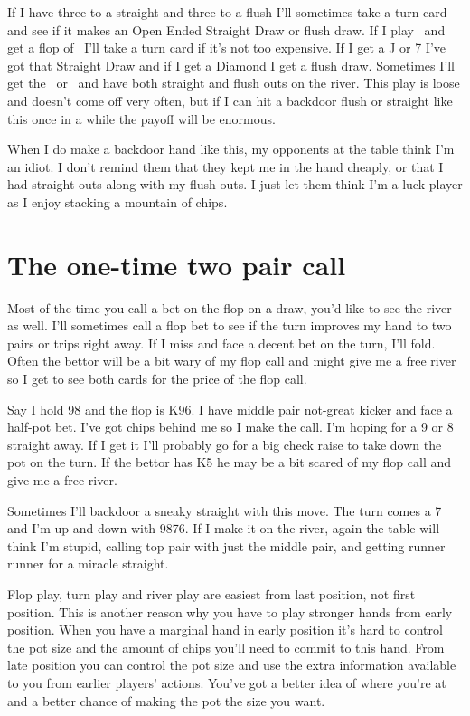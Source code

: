 If I have three to a straight and three to a flush I'll sometimes
take a turn card and see if it makes an Open Ended Straight Draw or
flush draw. If I play \tend\nined\ and get a flop of \Ah\eigd\twoc\ I'll take a
turn card if it's not too expensive. If I get a J or 7 I've got
that Straight Draw and if I get a Diamond I get a flush draw.
Sometimes I'll get the \Jd\ or \sevd\ and have both straight
and flush outs on the river. This play is loose and doesn't
come off very often, but if I can hit a backdoor flush or straight
like this once in a while the payoff will be enormous.

When I do make a backdoor hand like this, my opponents at the table
think I'm an idiot. I don't remind them that they kept me in
the hand cheaply, or that I had straight outs along with my flush
outs. I just let them think I'm a luck player as I enjoy stacking a
mountain of chips.

\section{The one-time two pair call}

Most of the time you call a bet on the flop on a draw, you'd like to
see the river as well. I'll sometimes call a flop bet to see if the
turn improves my hand to two pairs or trips right away.
If I miss and face a decent bet on the turn, I'll fold.
Often the bettor will be a bit wary of my flop call and might
give me a free river so I get to see both cards for the price of the flop call.

Say I hold 98 and the flop is K96. I have middle pair not-great
kicker and face a half-pot bet. I've got chips behind me so I make
the call. I'm hoping for a 9 or 8 straight away. If I get it I'll
probably go for a big check raise to take down the pot on the turn. If
the bettor has K5 he may be a bit scared of my flop call and give
me a free river.

Sometimes I'll backdoor a sneaky straight with this move. The turn comes
a 7 and I'm up and down with 9876. If I make it on the river,
again the table will think I'm stupid, calling top pair with just the
middle pair, and getting runner runner for a miracle straight.

Flop play, turn play and river play are easiest from last position, not
first position. This is another reason why you have to play stronger hands
from early position. When you have a marginal hand in early position
it's hard to control the pot size and the amount of chips
you'll need to commit to this hand. From late position you can control
the pot size and use the extra information available to you from
earlier players' actions. You've got a better idea of where you're at
and a better chance of making the pot the size you want.

